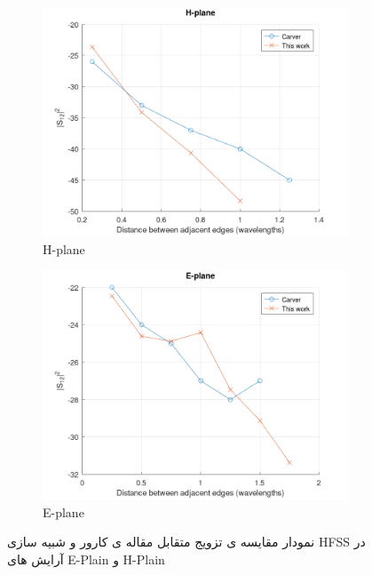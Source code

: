 \begin{figure}
	\centering
	\begin{subfigure}{0.5\textwidth} %
		\includegraphics[scale=0.25]{Images/H-plane.png}
		\caption{H-plane} %
		\label{fig24}
	\end{subfigure}
	\vspace{1em} %
	\begin{subfigure}{0.5\textwidth} %
		\includegraphics[scale=0.25]{Images/E-plane.png}
		\caption{E-plane} %
		\label{fig25}
	\end{subfigure}
	\caption{نمودار مقایسه ی تزویج متقابل مقاله ی کارور و شبیه سازی HFSS در آرایش های E-Plain و H-Plain }
\end{figure}


